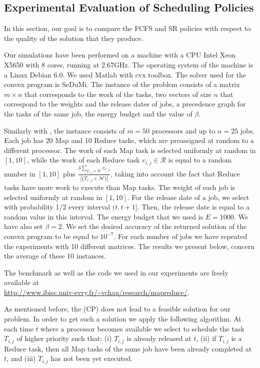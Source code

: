 \documentclass{llncs}
\newcommand{\fcfs}{\textsc{FCFS}\xspace}
\newcommand{\sr}{\textsc{SR}\xspace}
\begin{document}
\subsection{Experimental Evaluation of Scheduling Policies}

In this section, our goal is to compare the \fcfs and \sr policies with respect to the quality of the solution that they produce.


Our simulations have been performed on a machine with a CPU Intel Xeon X5650 with 8 cores, running at 2.67GHz.
The operating system of the machine is a Linux Debian 6.0.
We used Matlab with cvx toolbox.
The solver used for the convex program is SeDuMi.
The instance of the problem consists of a matrix $m \times n$ that corresponds to the work of the tasks,
two vectors of size $n$ that correspond to the weights and the release dates of jobs,
a precedence graph for the tasks of the same job,
the energy budget and the value of $\beta$.

Similarly with \cite{ChenKL12}, the instance consists of $m=50$ processors and up to $n=25$ jobs.
Each job has 20 Map and 10 Reduce tasks, which are preassigned at random to a different processor.
The work of each Map task is selected uniformly at random in $[1,10]$,
while the work of each Reduce task $v_{i,j} \in \mathcal{R}$ is equal to a random number in $[1,10]$ plus
$\frac{3\sum_{T_{i',j} \in \mathcal{M}} v_{i',j}}{|\{T_{i',j} \in \mathcal{M}\}|}$,
taking into account the fact that Reduce tasks have more work to execute than Map tasks.
The weight of each job is selected uniformly at random in $[1,10]$.
For the release date of a job, we select with probability 1/2 every interval $(t,t+1]$.
Then, the release date is equal to a random value in this interval.
The energy budget that we used is $E=1000$.
We have also set $\beta=2$.
We set the desired accuracy of the returned solution of the convex program to be equal to $10^{-7}$.
For each number of jobs we have repeated the experiments with 10 different matrices.
The results we present below, concern the average of these 10 instances.

The benchmark as well as the code we used in our experiments are freely available at\\
\url{http://www.ibisc.univ-evry.fr/~vchau/research/mapreduce/}.


As mentioned before, the (CP) does not lead to a feasible solution for our problem.
In order to get such a solution we apply the following algorithm.
At each time $t$ where a processor becomes available we select to schedule the task $T_{i,j}$ of higher priority such that:
(i) $T_{i,j}$ is already released at $t$,
(ii) if $T_{i,j}$ is a Reduce task, then all Map tasks of the same job have been already completed at $t$, and
(iii) $T_{i,j}$ has not been yet executed.
\end{document}
